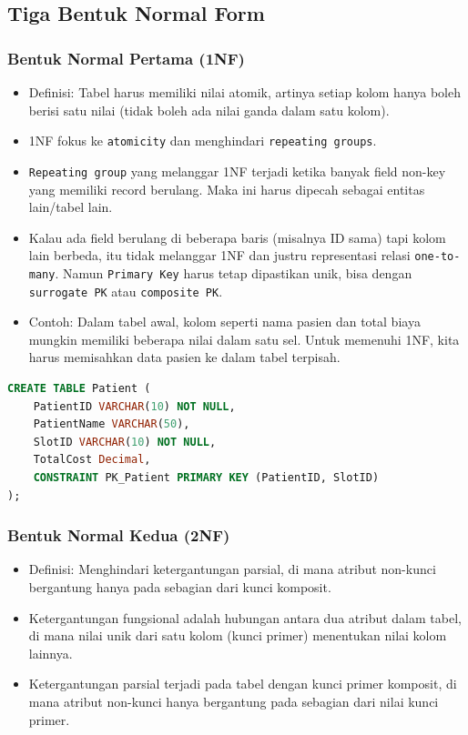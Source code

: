\documentclass{article}
\begin{document}
\subsection{Tiga Bentuk Normal Form}

\subsubsection{Bentuk Normal Pertama (1NF)}
\begin{itemize}
    \item Definisi: Tabel harus memiliki nilai atomik, artinya setiap kolom hanya boleh berisi satu nilai (tidak boleh ada nilai ganda dalam satu kolom).
    \item 1NF fokus ke \texttt{atomicity} dan menghindari \texttt{repeating groups}.
    \item \texttt{Repeating group} yang melanggar 1NF terjadi ketika banyak field non-key yang memiliki record berulang. Maka ini harus dipecah sebagai entitas lain/tabel lain.
    \item Kalau ada field berulang di beberapa baris (misalnya ID sama) tapi kolom lain berbeda, itu tidak melanggar 1NF dan justru representasi relasi \texttt{one-to-many}. Namun \texttt{Primary Key} harus tetap dipastikan unik, bisa dengan \texttt{surrogate PK} atau \texttt{composite PK}.
    \item Contoh: Dalam tabel awal, kolom seperti nama pasien dan total biaya mungkin memiliki beberapa nilai dalam satu sel. Untuk memenuhi 1NF, kita harus memisahkan data pasien ke dalam tabel terpisah.
\end{itemize}
\begin{lstlisting}[language=SQL, caption={SQL untuk Membuat Tabel Pasien (Memenuhi 1NF)}, captionpos=b]
CREATE TABLE Patient (
    PatientID VARCHAR(10) NOT NULL,
    PatientName VARCHAR(50),
    SlotID VARCHAR(10) NOT NULL,
    TotalCost Decimal,
    CONSTRAINT PK_Patient PRIMARY KEY (PatientID, SlotID)
);
\end{lstlisting}

\subsubsection{Bentuk Normal Kedua (2NF)}
\begin{itemize}
    \item Definisi: Menghindari ketergantungan parsial, di mana atribut non-kunci bergantung hanya pada sebagian dari kunci komposit.
    \item Ketergantungan fungsional adalah hubungan antara dua atribut dalam tabel, di mana nilai unik dari satu kolom (kunci primer) menentukan nilai kolom lainnya.
    \item Ketergantungan parsial terjadi pada tabel dengan kunci primer komposit, di mana atribut non-kunci hanya bergantung pada sebagian dari nilai kunci primer.
\end{itemize}
\end{document}
